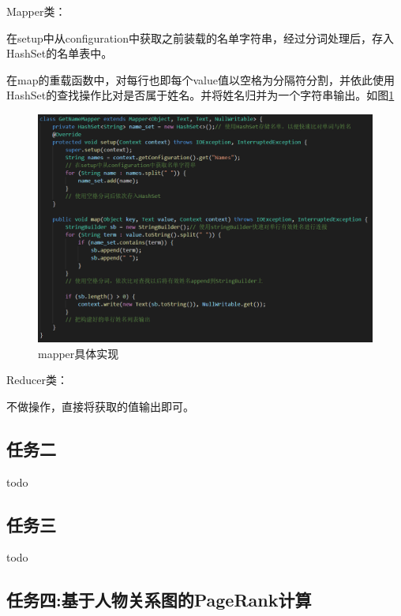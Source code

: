 \documentclass[a4paper,UTF8]{article}
\numberwithin{equation}{section}
\begin{document}
\par Mapper类：
\par 在setup中从configuration中获取之前装载的名单字符串，经过分词处理后，存入HashSet的名单表中。
\par 在map的重载函数中，对每行也即每个value值以空格为分隔符分割，并依此使用HashSet的查找操作比对是否属于姓名。并将姓名归并为一个字符串输出。如图\ref{task1-mapper}
\begin{figure}[htbp]
    \centering
    \includegraphics[width = 15cm]{task1-mapper.png}
    \caption{mapper具体实现}
    \label{task1-mapper}
\end{figure}

\par Reducer类：
\par 不做操作，直接将获取的值输出即可。

\subsection{任务二}
todo

\subsection{任务三}
todo

\subsection{任务四:基于人物关系图的PageRank计算}
\end{document}
